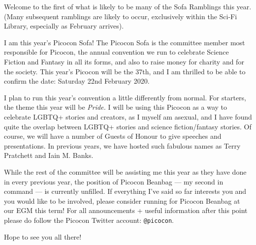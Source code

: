 Welcome to the first of what is likely to be many of the Sofa
Ramblings\texttrademark{} this year. (Many subsequent ramblings are
likely to occur, exclusively within the Sci-Fi Library, especially as
February arrives).

I am this year’s Picocon Sofa! The Picocon Sofa is the committee
member most responsible for Picocon, the annual convention we run to
celebrate Science Fiction and Fantasy in all its forms, and also to
raise money for charity and for the society.  This year’s Picocon will
be the 37th, and I am thrilled to be able to confirm the date:
Saturday 22nd February 2020.

I plan to run this year’s convention a little differently from
normal. For starters, the theme this year will be \emph{Pride.} I will
be using this Picocon as a way to celebrate LGBTQ+ stories and
creators, as I myself am asexual, and I have found quite the overlap
between LGBTQ+ stories and science fiction/fantasy stories. Of course,
we will have a number of Guests of Honour to give speeches and
presentations. In previous years, we have hosted such fabulous names
as Terry Pratchett and Iain M. Banks.

While the rest of the committee will be assisting me this year as they
have done in every previous year, the position of Picocon Beanbag ---
my second in command --- is currently unfilled. If everything I’ve
said so far interests you and you would like to be involved, please
consider running for Picocon Beanbag at our EGM this term! For all
announcements + useful information after this point please do follow
the Picocon Twitter account: \texttt{@picocon}.

Hope to see you all there!
